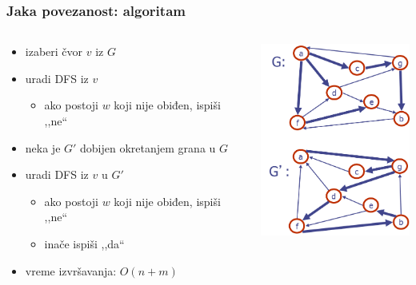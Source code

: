 \documentclass[compress]{beamer}
\begin{document}
\begin{frame}[fragile]
  \frametitle{Jaka povezanost: algoritam}
  \begin{columns}
    \begin{column}[t]{6cm}
      \begin{itemize}
        \item izaberi čvor $v$ iz $G$
        \item uradi DFS iz $v$
        \begin{itemize}
          \item ako postoji $w$ koji nije obiđen, ispiši ,,ne``
        \end{itemize}
        \item neka je $G'$ dobijen okretanjem grana u $G$
        \item uradi DFS iz $v$ u $G'$
        \begin{itemize}
          \item ako postoji $w$ koji nije obiđen, ispiši ,,ne``
          \item inače ispiši ,,da``
        \end{itemize}
        \item vreme izvršavanja: $O(n+m)$
      \end{itemize}
    \end{column}
    \begin{column}[t]{6cm}
      \begin{center}
        \includegraphics[width=5cm]{asp-14-pic33.png}
      \end{center}
    \end{column}
  \end{columns}
\end{frame}
\end{document}
